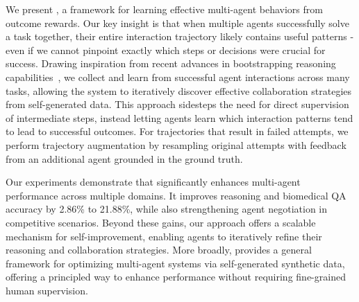 We present \model{}, a framework for learning effective multi-agent behaviors from outcome rewards. Our key insight is that when multiple agents successfully solve a task together, their entire interaction trajectory likely contains useful patterns - even if we cannot pinpoint exactly which steps or decisions were crucial for success. Drawing inspiration from recent advances in bootstrapping reasoning capabilities~\citep{zelikman2022star}, we collect and learn from successful agent interactions across many tasks, allowing the system to iteratively discover effective collaboration strategies from self-generated data. This approach sidesteps the need for direct supervision of intermediate steps, instead letting agents learn which interaction patterns tend to lead to successful outcomes. For trajectories that result in failed attempts, we perform trajectory augmentation by resampling original attempts with feedback from an additional agent grounded in the ground truth.

Our experiments demonstrate that \model{} significantly enhances multi-agent performance across multiple domains. It improves reasoning and biomedical QA accuracy by 2.86\% to 21.88\%, while also strengthening agent negotiation in competitive scenarios. Beyond these gains, our approach offers a scalable mechanism for self-improvement, enabling agents to iteratively refine their reasoning and collaboration strategies. More broadly, \model{} provides a general framework for optimizing multi-agent systems via self-generated synthetic data, offering a principled way to enhance performance without requiring fine-grained human supervision.
